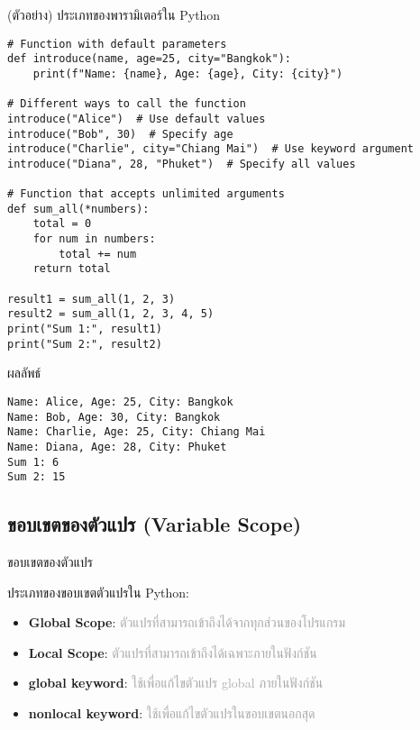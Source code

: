 \documentclass[12pt,a4paper]{article}
\newcommand{\textlight}[1]{{\thailightfont #1}}
\begin{document}
\begin{codebox}{(ตัวอย่าง) ประเภทของพารามิเตอร์ใน Python}
\begin{lstlisting}[style=python]
# Function with default parameters
def introduce(name, age=25, city="Bangkok"):
    print(f"Name: {name}, Age: {age}, City: {city}")

# Different ways to call the function
introduce("Alice")  # Use default values
introduce("Bob", 30)  # Specify age
introduce("Charlie", city="Chiang Mai")  # Use keyword argument
introduce("Diana", 28, "Phuket")  # Specify all values

# Function that accepts unlimited arguments
def sum_all(*numbers):
    total = 0
    for num in numbers:
        total += num
    return total

result1 = sum_all(1, 2, 3)
result2 = sum_all(1, 2, 3, 4, 5)
print("Sum 1:", result1)
print("Sum 2:", result2)
\end{lstlisting}
\end{codebox}

\begin{resultbox}{ผลลัพธ์}
\begin{verbatim}
Name: Alice, Age: 25, City: Bangkok
Name: Bob, Age: 30, City: Bangkok
Name: Charlie, Age: 25, City: Chiang Mai
Name: Diana, Age: 28, City: Phuket
Sum 1: 6
Sum 2: 15
\end{verbatim}
\end{resultbox}

\subsection{ขอบเขตของตัวแปร (Variable Scope)}

\hspace{1cm}\textlight{ขอบเขตของตัวแปร (Variable Scope) กำหนดว่าตัวแปรสามารถเข้าถึงได้จากส่วนไหนของโปรแกรม ใน Python มีขอบเขตหลัก 2 ประเภท คือ ขอบเขตทั่วไป (Global Scope) และขอบเขตท้องถิ่น (Local Scope)}

\begin{noticebox}{ขอบเขตของตัวแปร}

\textlight{ประเภทของขอบเขตตัวแปรใน Python:}

\begin{itemize}
    \item \textbf{Global Scope}: \textcolor{darkgray}{ตัวแปรที่สามารถเข้าถึงได้จากทุกส่วนของโปรแกรม}
    \item \textbf{Local Scope}: \textcolor{darkgray}{ตัวแปรที่สามารถเข้าถึงได้เฉพาะภายในฟังก์ชัน}
    \item \textbf{global keyword}: \textcolor{darkgray}{ใช้เพื่อแก้ไขตัวแปร global ภายในฟังก์ชัน}
    \item \textbf{nonlocal keyword}: \textcolor{darkgray}{ใช้เพื่อแก้ไขตัวแปรในขอบเขตนอกสุด}
\end{itemize}

\end{noticebox}
\end{document}
